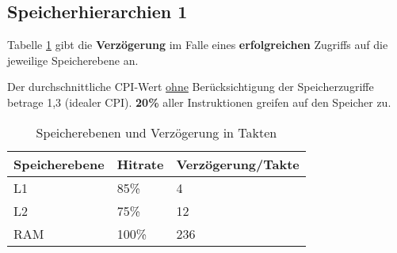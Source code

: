 \setcounter{subsection}{3}
\subsection{Speicherhierarchien 1}
Tabelle \ref{tbl:hirachy1} gibt die \textbf{Verzögerung} im Falle eines \textbf{erfolgreichen} Zugriffs auf die jeweilige Speicherebene an.

Der durchschnittliche CPI-Wert \underline{ohne} Berücksichtigung der Speicherzugriffe betrage 1,3 (idealer CPI). \textbf{20\%} aller Instruktionen greifen auf den Speicher zu.

\begin{table}[h!]
	\centering
	\begin{tabular}{lll}
		\hline
		Speicherebene & Hitrate & Verzögerung/Takte \\\hline
		L1 & 85\% & 4 \\
		L2 & 75\% & 12 \\
		RAM & 100\% & 236 \\\hline
	\end{tabular}
	\caption{Speicherebenen und Verzögerung in Takten}
	\label{tbl:hirachy1}
\end{table}

